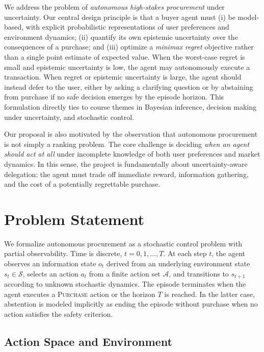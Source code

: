 \documentclass[11pt]{article}
\begin{document}
We address the problem of \emph{autonomous high-stakes procurement} under uncertainty. Our central design principle is that a buyer agent must (i) be model-based, with explicit probabilistic representations of user preferences and environment dynamics; (ii) quantify its own epistemic uncertainty over the consequences of a purchase; and (iii) optimize a \emph{minimax regret} objective rather than a single point estimate of expected value.\cite{rigter2020minimax,regretDecision1982} When the worst-case regret is small and epistemic uncertainty is low, the agent may autonomously execute a transaction. When regret or epistemic uncertainty is large, the agent should instead defer to the user, either by asking a clarifying question or by abstaining from purchase if no safe decision emerges by the episode horizon. This formulation directly ties to course themes in Bayesian inference, decision making under uncertainty, and stochastic control.\cite{charpentier2022disentangling}

Our proposal is also motivated by the observation that autonomous procurement is not simply a ranking problem. The core challenge is deciding \emph{when an agent should act at all} under incomplete knowledge of both user preferences and market dynamics. In this sense, the project is fundamentally about uncertainty-aware delegation: the agent must trade off immediate reward, information gathering, and the cost of a potentially regrettable purchase.

\section{Problem Statement}

We formalize autonomous procurement as a stochastic control problem with partial observability. Time is discrete, $t = 0,1,\dots,T$. At each step $t$, the agent observes an information state $o_t$ derived from an underlying environment state $s_t \in \mathcal{S}$, selects an action $a_t$ from a finite action set $\mathcal{A}$, and transitions to $s_{t+1}$ according to unknown stochastic dynamics. The episode terminates when the agent executes a \textsc{Purchase} action or the horizon $T$ is reached. In the latter case, abstention is modeled implicitly as ending the episode without purchase when no action satisfies the safety criterion.

\subsection{Action Space and Environment}
\end{document}
